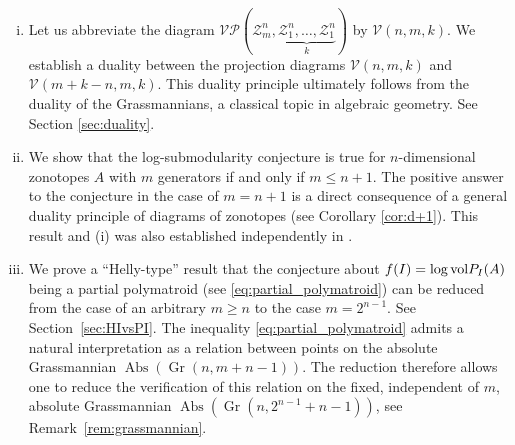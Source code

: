 \documentclass[11pt]{amsart}
\newcommand{\cV}{\mathcal V}
\newcommand{\VP}{\mathcal{VP}}
\newcommand{\Z}{\mathcal Z}
\def\vol{{\rm vol}}
\theoremstyle{definition}
\theoremstyle{remark}
\begin{document}
\begin{enumerate}[(i)] 
    \item Let us abbreviate  the diagram $\VP(\Z_m^n,\underbrace{\Z_1^n,\dots, \Z_1^n}_{k})$ by $\cV(n,m,k)$.
    We establish a duality between the projection diagrams $\cV(n,m,k)$ and $\cV(m+k-n,m,k)$. This duality principle ultimately follows from the duality of the Grassmannians, a classical topic in algebraic geometry. See Section \ref{sec:duality}. 	 
    \item We show that the log-submodularity conjecture is true for $n$-dimensional zonotopes $A$ with $m$ generators if and only if $m \le n+1$. The positive answer to the conjecture in the case of $m=n+1$ is a direct consequence of a general duality principle of diagrams of zonotopes (see Corollary \ref{cor:d+1}). This result and (i) was also established independently in \cite{FHMNZ}.
    \item We prove a ``Helly-type'' result that the conjecture about $f(I) = \log \vol P_I(A)$ being a partial polymatroid (see \eqref{eq:partial_polymatroid}) can be reduced from the case of an arbitrary $m \ge n$ to the case $m=2^{n-1}$. See Section~\ref{sec:HIvsPI}. 
The inequality \eqref{eq:partial_polymatroid}  admits a natural interpretation as a relation between points on the absolute Grassmannian $\operatorname{Abs}(\operatorname{Gr}(n,m+n-1))$. The reduction therefore allows one to reduce the verification of this relation on 
 the fixed, independent of $m$, absolute Grassmannian $\operatorname{Abs}(\operatorname{Gr}(n,2^{n-1}+n-1))$, see Remark~\ref{rem:grassmannian}.


\end{enumerate}
\end{document}
